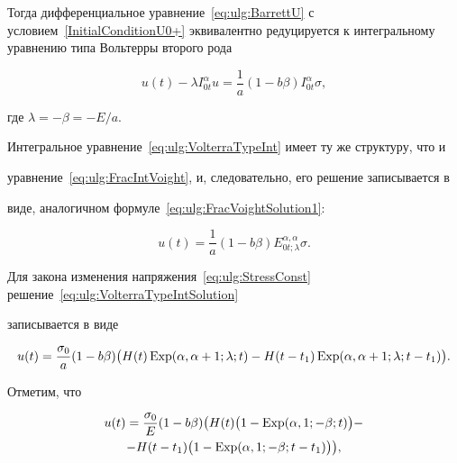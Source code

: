  Тогда дифференциальное уравнение~\eqref{eq:ulg:BarrettU} с условием~\eqref{InitialConditionU0+} эквивалентно редуцируется к интегральному уравнению типа Вольтерры второго рода

\begin{equation}\label{eq:ulg:VolterraTypeInt}

u(t)-\lambda

I_{0t}^{\alpha}u=\frac{1}{a}(1-b\beta)I_{0t}^{\alpha}\sigma,

\end{equation}

где $\lambda=-\beta=-E/a$.



Интегральное уравнение~\eqref{eq:ulg:VolterraTypeInt} имеет ту же структуру, что и

уравнение~\eqref{eq:ulg:FracIntVoight}, и, следовательно, его решение записывается в

виде, аналогичном формуле~\eqref{eq:ulg:FracVoightSolution1}:

\begin{equation}\label{eq:ulg:VolterraTypeIntSolution}

u(t)=\frac{1}{a}(1-b\beta)E_{0t;\lambda}^{\alpha,\alpha}\sigma.

\end{equation}



Для закона изменения напряжения~\eqref{eq:ulg:StressConst} решение~\eqref{eq:ulg:VolterraTypeIntSolution}

записывается в виде

\begin{equation*}

u(t)=\frac{\sigma_{0}}{a}(1-b\beta)

\bigl(

H(t)  \mathop{\rm Exp}\nolimits  (\alpha,\alpha+1;\lambda;t)-H(t-t_{1})  \mathop{\rm Exp}\nolimits  (\alpha,\alpha+1;\lambda;t-t_{1})

\bigr).  \end{equation*}



Отметим, что

\begin{multline}\label{eq:ulg:KelvinZenerSolution}

u(t)=\frac{\sigma_{0}}{E}(1-b\beta)

\bigl(H(t) \bigl(1-  \mathop{\rm Exp}\nolimits  (\alpha, 1;-\beta;t)\bigr)-\\

-H(t-t_{1})\bigl(1-  \mathop{\rm Exp}\nolimits  (\alpha, 1;-\beta;t-t_{1})\bigr)

\bigr), \end{multline}

